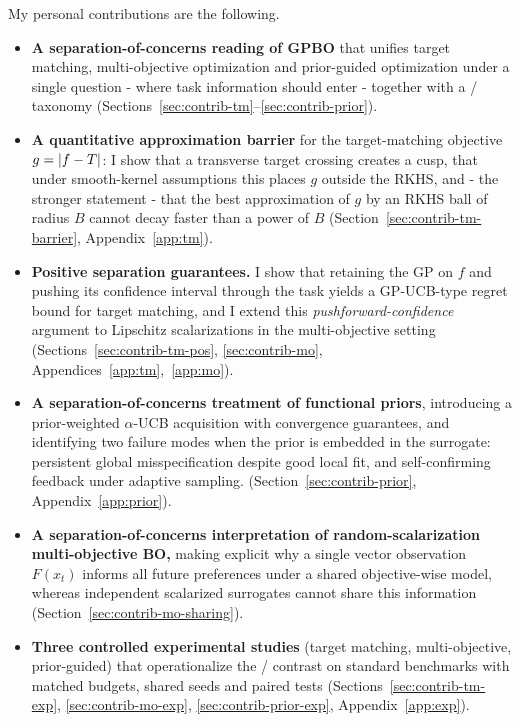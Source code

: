\noindent My personal contributions are the following.
\begin{itemize}
  \item \textbf{A separation-of-concerns reading of GPBO} that unifies target
        matching, multi-objective optimization and prior-guided optimization
        under a single question - where task information should enter -
        together with a \RIGHT/\WRONG{} taxonomy
        (Sections~\ref{sec:contrib-tm}--\ref{sec:contrib-prior}).
        \hfill{}
  \item \textbf{A quantitative approximation barrier} for the target-matching
        objective $g=\left\lvert f-T\right\rvert$: I show that a transverse target crossing
        creates a cusp, that under smooth-kernel assumptions this places $g$
        outside the RKHS, and - the stronger statement - that the best
        approximation of $g$ by an RKHS ball of radius $B$ cannot decay faster
        than a power of $B$ (Section~\ref{sec:contrib-tm-barrier},
        Appendix~\ref{app:tm}).
        \hfill{}
  \item \textbf{Positive separation guarantees.} I show that retaining the GP on
        $f$ and pushing its confidence interval through the task yields a
        GP-UCB-type regret bound for target matching, and I extend this
        \emph{pushforward-confidence} argument to Lipschitz scalarizations in the
        multi-objective setting (Sections~\ref{sec:contrib-tm-pos},
        \ref{sec:contrib-mo}, Appendices~\ref{app:tm},~\ref{app:mo}).
        \hfill{}
  \item \textbf{A separation-of-concerns treatment of functional priors}, introducing a prior-weighted $\alpha$-UCB acquisition with convergence guarantees, and identifying two failure modes when the prior is embedded in the surrogate: persistent global misspecification despite good local fit, and self-confirming feedback under adaptive sampling. (Section~\ref{sec:contrib-prior},
        Appendix~\ref{app:prior}).
        \hfill{}
  \item \textbf{A separation-of-concerns interpretation of random-scalarization
        multi-objective BO,} making explicit why a single vector observation
        $F(x_t)$ informs all future preferences under a shared objective-wise
        model, whereas independent scalarized surrogates cannot share this
        information (Section~\ref{sec:contrib-mo-sharing}).
        \hfill{}
  \item \textbf{Three controlled experimental studies} (target matching,
        multi-objective, prior-guided) that operationalize the \RIGHT/\WRONG{}
        contrast on standard benchmarks with matched budgets, shared seeds and
        paired tests (Sections~\ref{sec:contrib-tm-exp},
        \ref{sec:contrib-mo-exp}, \ref{sec:contrib-prior-exp},
        Appendix~\ref{app:exp}).
        \hfill{}
\end{itemize}

